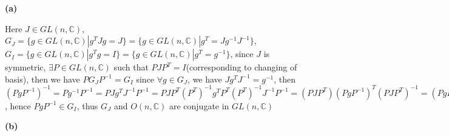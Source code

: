 \documentclass[main]{subfiles}
\begin{document}
\begin{exercise}
\begin{enumerate}[label=(\alph*),leftmargin=*]

\end{enumerate}
\end{exercise}

\textbf{(a)} \par
Here $J\in GL(n,\mathbb{C})$, $G_J=\{g\in GL(n,\mathbb{C})|g^TJg=J\}=\{g\in GL(n,\mathbb{C})|g^T=Jg^{-1}J^{-1}\}$, $G_I=\{g\in GL(n,\mathbb{C})|g^Tg=I\}=\{g\in GL(n,\mathbb{C})|g^T=g^{-1}\}$, since $J$ is symmetric, $\exists P\in GL(n,\mathbb{C})$ such that $PJP^T=I$(corresponding to changing of basis), then we have $PG_JP^{-1}=G_I$ since $\forall g\in G_J$, we have $Jg^TJ^{-1}=g^{-1}$, then $(PgP^{-1})^{-1}=Pg^{-1}P^{-1}=PJg^TJ^{-1}P^{-1}=PJP^T(P^T)^{-1}g^TP^T(P^T)^{-1}J^{-1}P^{-1}=(PJP^T)(PgP^{-1})^T(PJP^T)^{-1}=(PgP^{-1})^T$, hence $PgP^{-1}\in G_I$, thus $G_J$ and $O(n,\mathbb{C})$ are conjugate in $GL(n,\mathbb{C})$ \par
\textbf{(b)} \par
\end{document}
